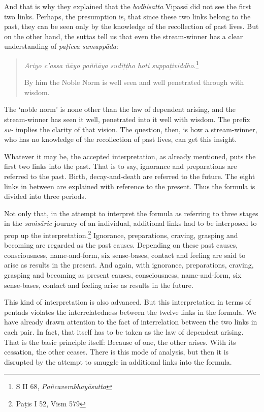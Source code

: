 And that is why they explained that the \emph{bodhisatta} Vipassī did not see the first two links. Perhaps, the presumption is, that since these two links belong to the past, they can be seen only by the knowledge of the recollection of past lives. But on the other hand, the suttas tell us that even the stream-winner has a clear understanding of \emph{paṭicca samuppāda}:

\begin{quote}
\emph{Ariyo c'assa ñāyo paññāya sudiṭṭho hoti suppaṭividdho}.\footnote{S II 68, \emph{Pañcaverabhayāsutta}}

By him the Noble Norm is well seen and well penetrated through with wisdom.
\end{quote}

The `noble norm' is none other than the law of dependent arising, and the stream-winner has seen it well, penetrated into it well with wisdom. The prefix \emph{su-} implies the clarity of that vision. The question, then, is how a stream-winner, who has no knowledge of the recollection of past lives, can get this insight.

Whatever it may be, the accepted interpretation, as already mentioned, puts the first two links into the past. That is to say, ignorance and preparations are referred to the past. Birth, decay-and-death are referred to the future. The eight links in between are explained with reference to the present. Thus the formula is divided into three periods.

Not only that, in the attempt to interpret the formula as referring to three stages in the \emph{saṁsāric} journey of an individual, additional links had to be interposed to prop up the interpretation.\footnote{Paṭis I 52, Vism 579} Ignorance, preparations, craving, grasping and becoming are regarded as the past causes. Depending on these past causes, consciousness, name-and-form, six sense-bases, contact and feeling are said to arise as results in the present. And again, with ignorance, preparations, craving, grasping and becoming as present causes, consciousness, name-and-form, six sense-bases, contact and feeling arise as results in the future.

This kind of interpretation is also advanced. But this interpretation in terms of pentads violates the interrelatedness between the twelve links in the formula. We have already drawn attention to the fact of interrelation between the two links in each pair. In fact, that itself has to be taken as the law of dependent arising. That is the basic principle itself: Because of one, the other arises. With its cessation, the other ceases. There is this mode of analysis, but then it is disrupted by the attempt to smuggle in additional links into the formula.

